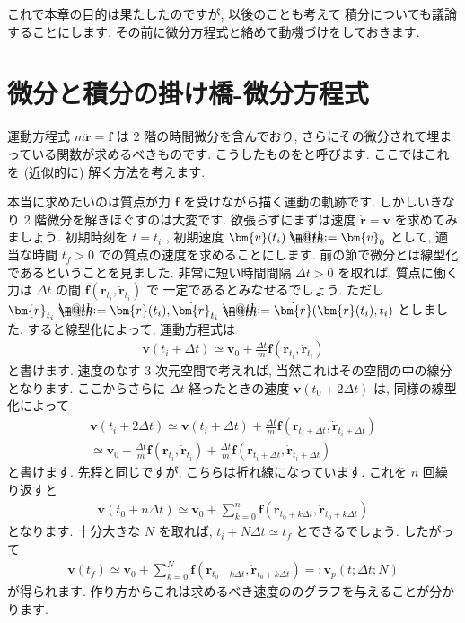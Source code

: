 \documentclass[openany, a4paper, oneside]{jsbook}
\makeatletter
\newcommand*{\defeq}{\mathrel{\rlap{%
\raisebox{0.3ex}{$\m@th\cdot$}}%
\raisebox{-0.3ex}{$\m@th\cdot$}}%
=}
\theoremstyle{break}
\theoremstyle{breakdefn}
\newcommand{\deltat}{\varDelta t}
\makeatother
\begin{document}
これで本章の目的は果たしたのですが, 以後のことも考えて
積分についても議論することにします.
その前に微分方程式と絡めて動機づけをしておきます.
\section{微分と積分の掛け橋-微分方程式\label{sec:微分と積分の掛け橋}}


運動方程式 $m \ddot{ \bm{r} } = \bm{f}$ は 2 階の時間微分を含んでおり,
さらにその微分されて埋まっている関数が求めるべきものです.
こうしたものをと呼びます.
ここではこれを (近似的に) 解く方法を考えます.

本当に求めたいのは質点が力 $\bm{f}$ を受けながら描く運動の軌跡です.
しかしいきなり 2 階微分を解きほぐすのは大変です.
欲張らずにまずは速度 $\dot{ \bm{r} } = \bm{v}$ を求めてみましょう.
初期時刻を $t = t_i$ , 初期速度 $\bm{v} ( t_i ) \defeq \bm{v}_0$ として,
適当な時間 $t_f>0$ での質点の速度を求めることにします.
前の節で微分とは線型化であるということを見ました.
非常に短い時間間隔 $\varDelta t >0$ を取れば, 質点に働く力は
$\deltat$ の間 $\bm{f} ( \bm{r}_{ t_i } , \dot{ \bm{r} }_{t_i} )$ で
一定であるとみなせるでしょう.
ただし $\bm{r}_{t_i} \defeq \bm{r} (t_i) , \dot{ \bm{r} }_{t_i} \defeq \dot{ \bm{r} } ( \bm{r} ( t_i ) , t_i )$
としました.
すると線型化によって, 運動方程式は
\begin{gather}
\bm{v} ( t_i + \deltat )
\simeq
\bm{v}_0 + \frac{\deltat} {m} \bm{f} ( \bm{r}_{ t_i } , \dot{ \bm{r} }_{t_i} )
\end{gather}
と書けます.
速度のなす 3 次元空間で考えれば, 当然これはその空間の中の線分となります.
ここからさらに $\deltat$ 経ったときの速度 $\bm{v} (t_0 + 2 \deltat)$ は,
同様の線型化によって
\begin{gather}
\bm{v} ( t_i + 2 \deltat )
\simeq
\bm{v} ( t_i + \deltat ) + \frac{\deltat} {m} \bm{f} ( \bm{r}_{ t_i + \deltat } , \dot{ \bm{r} }_{t_i + \deltat} )\\
\simeq
\bm{v}_0 + \frac{\deltat} {m} \bm{f} ( \bm{r}_{ t_i } , \dot{ \bm{r} }_{t_i} )
+\frac{\deltat} {m} \bm{f} ( \bm{r}_{ t_i + \deltat } , \dot{ \bm{r} }_{t_i + \deltat} )
\end{gather}
と書けます.
先程と同じですが, こちらは折れ線になっています.
これを $n$ 回繰り返すと
\begin{gather}
\bm{v} ( t_0 + n \deltat )
\simeq
\bm{v}_0 + \sum_{k=0}^n \bm{f} ( \bm{r}_{ t_0 + k \deltat } , \dot{ \bm{r} }_{t_0 + k \deltat} )
\end{gather}
となります.
十分大きな $N$ を取れば,  $t_i + N \deltat \simeq t_f$ とできるでしょう.
したがって
\begin{gather}
\bm{v} ( t_f )
\simeq
\bm{v}_0 + \sum_{k=0}^N \bm{f} ( \bm{r}_{ t_0 + k \deltat } , \dot{ \bm{r} }_{t_0 + k \deltat} )
=:
\bm{v}_p ( t ; \deltat ; N )
\end{gather}
が得られます.
作り方からこれは求めるべき速度ののグラフを与えることが分かります.
\end{document}
